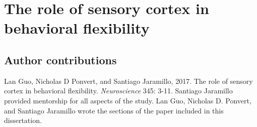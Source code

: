 \newcommand{\Tasks}{1}
\newcommand{\StimOutcome}{\Tasks A}
\newcommand{\StimAction}{\Tasks B}
\newcommand{\FeatureRelevance}{\Tasks C}

\newcommand{\Mechanisms}{2}
\newcommand{\LTP}{\Tasks A}
\newcommand{\TopDown}{\Tasks A}

\chapter{The role of sensory cortex in behavioral flexibility}

\section{Author contributions}
\noindent Lan Guo, Nicholas D Ponvert, and Santiago Jaramillo, 2017. The role of sensory cortex in behavioral flexibility. \textit{Neuroscience} 345: 3-11. 
%
Santiago Jaramillo provided mentorship for all aspects of the study. Lan Guo, Nicholas D. Ponvert, and Santiago Jaramillo wrote the sections of the paper included in this dissertation.



